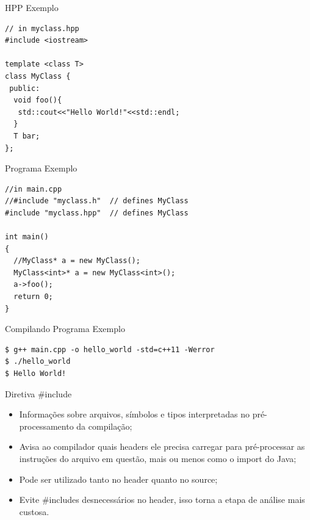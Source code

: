 \documentclass[12pt,table,xcolor={dvipsnames}]{beamer}
\begin{document}
\begin{frame}[fragile]{HPP Exemplo}
\begin{lstlisting}
// in myclass.hpp
#include <iostream>

template <class T>
class MyClass {
 public:
  void foo(){
   std::cout<<"Hello World!"<<std::endl;
  }
  T bar;
};
\end{lstlisting}
\end{frame}

\begin{frame}[fragile]{Programa Exemplo}
\begin{lstlisting}
//in main.cpp
//#include "myclass.h"  // defines MyClass
#include "myclass.hpp"  // defines MyClass

int main()
{
  //MyClass* a = new MyClass();
  MyClass<int>* a = new MyClass<int>();
  a->foo();
  return 0;
}
\end{lstlisting}
\end{frame}

\begin{frame}[fragile]{Compilando Programa Exemplo}
\begin{lstlisting}
$ g++ main.cpp -o hello_world -std=c++11 -Werror
$ ./hello_world
$ Hello World!
\end{lstlisting}
\end{frame}


\begin{frame}[fragile]{Diretiva \#include}
\begin{itemize}
\item Informações sobre arquivos, símbolos e tipos interpretadas no pré-processamento da compilação;
\item Avisa ao compilador quais headers ele precisa carregar para pré-processar as instruções do arquivo em questão, mais ou menos como o import do Java;
\item Pode ser utilizado tanto no header quanto no source;
\item Evite \#includes desnecessários no header, isso torna a etapa de análise mais custosa.
\end{itemize}
\end{frame}
\end{document}
